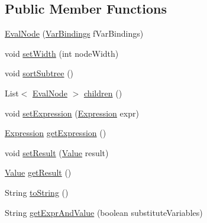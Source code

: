 \subsection*{Public Member Functions}
\begin{DoxyCompactItemize}
\item 
\hyperlink{classorg_1_1tzi_1_1use_1_1uml_1_1ocl_1_1expr_1_1_eval_node_aa0ecf8ff896ee861815be99564e28357}{Eval\-Node} (\hyperlink{classorg_1_1tzi_1_1use_1_1uml_1_1ocl_1_1value_1_1_var_bindings}{Var\-Bindings} f\-Var\-Bindings)
\item 
void \hyperlink{classorg_1_1tzi_1_1use_1_1uml_1_1ocl_1_1expr_1_1_eval_node_adbe703aface239d7c1f916fd69508312}{set\-Width} (int node\-Width)
\item 
void \hyperlink{classorg_1_1tzi_1_1use_1_1uml_1_1ocl_1_1expr_1_1_eval_node_abd4ce9bda5911bf82cd4a6647bb6d8a6}{sort\-Subtree} ()
\item 
List$<$ \hyperlink{classorg_1_1tzi_1_1use_1_1uml_1_1ocl_1_1expr_1_1_eval_node}{Eval\-Node} $>$ \hyperlink{classorg_1_1tzi_1_1use_1_1uml_1_1ocl_1_1expr_1_1_eval_node_a5063124e0d9e4578b2f587e38a78d5ce}{children} ()
\item 
void \hyperlink{classorg_1_1tzi_1_1use_1_1uml_1_1ocl_1_1expr_1_1_eval_node_a2315acae5acaf8ebd5f98b8c028cba0a}{set\-Expression} (\hyperlink{classorg_1_1tzi_1_1use_1_1uml_1_1ocl_1_1expr_1_1_expression}{Expression} expr)
\item 
\hyperlink{classorg_1_1tzi_1_1use_1_1uml_1_1ocl_1_1expr_1_1_expression}{Expression} \hyperlink{classorg_1_1tzi_1_1use_1_1uml_1_1ocl_1_1expr_1_1_eval_node_a9fe224c4759849782d876dbaaf947822}{get\-Expression} ()
\item 
void \hyperlink{classorg_1_1tzi_1_1use_1_1uml_1_1ocl_1_1expr_1_1_eval_node_ab2b977da64858c0f7c10a9804a480853}{set\-Result} (\hyperlink{classorg_1_1tzi_1_1use_1_1uml_1_1ocl_1_1value_1_1_value}{Value} result)
\item 
\hyperlink{classorg_1_1tzi_1_1use_1_1uml_1_1ocl_1_1value_1_1_value}{Value} \hyperlink{classorg_1_1tzi_1_1use_1_1uml_1_1ocl_1_1expr_1_1_eval_node_abdb556c40729b8f458ddb34f8a86d9a5}{get\-Result} ()
\item 
String \hyperlink{classorg_1_1tzi_1_1use_1_1uml_1_1ocl_1_1expr_1_1_eval_node_aa9153cb503951895f33b2c9dfbfb2d34}{to\-String} ()
\item 
String \hyperlink{classorg_1_1tzi_1_1use_1_1uml_1_1ocl_1_1expr_1_1_eval_node_a204fc4d622fd072b00b4fdb7393f17b2}{get\-Expr\-And\-Value} (boolean substitute\-Variables)
\item 

\end{DoxyCompactItemize}
